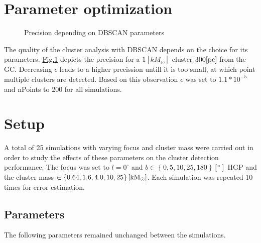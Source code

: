 \documentclass[letterpaper,10pt,english]{sphinxmanual}
\begin{document}
\section{Parameter optimization}
\label{\detokenize{NBodySimulation/Experiments:parameter-optimization}}
\begin{figure}[htbp]
\centering
\capstart

\noindent{}
\caption{Precision depending on DBSCAN parameters}\label{\detokenize{NBodySimulation/Experiments:id2}}\label{\detokenize{NBodySimulation/Experiments:fig-dbscan}}\end{figure}

\sphinxAtStartPar
The quality of the cluster analysis with DBSCAN depends on the choice for its parameters.
\hyperref[\detokenize{NBodySimulation/Experiments:fig-dbscan}]{Fig.\@ \ref{\detokenize{NBodySimulation/Experiments:fig-dbscan}}} depicts the precision for a \(1 [kM_\odot]\) cluster \(300 \textup{[pc]}\) from the GC.
Decreasing \(\epsilon\) leads to a higher precission untill it is too small, at which point multiple clusters are detected.
Based on this observation \(\epsilon\) was set to \(1.1*10^{-5}\) and nPoints to 200 for all simulations.


\section{Setup}
\label{\detokenize{NBodySimulation/Experiments:setup}}
\sphinxAtStartPar
A total of 25 simulations with varying focus and cluster mass were carried out in order to study the effects of these parameters on the cluster detection performance.
The focus was set to \(l=0^{\circ}\) and \(b \in \left \{0,5,10,25,180 \right \}[^\circ]\) HGP and the cluster mass \(\in \left \{0.64, 1.6, 4.0, 10, 25 \right \} [\textup{kM}_\odot]\).
Each simulation was repeated 10 times for error estimation.


\subsection{Parameters}
\label{\detokenize{NBodySimulation/Experiments:parameters}}\label{\detokenize{NBodySimulation/Experiments:parameters-label}}
\sphinxAtStartPar
The following parameters remained unchanged between the simulations.
\end{document}

